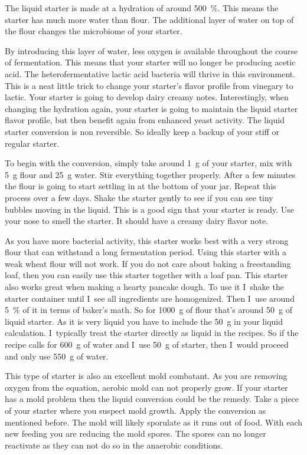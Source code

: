 The liquid starter is made at a hydration of around \qty{500}{\percent}. This means
the starter has much more water than flour. The additional layer of water on
top of the flour changes the microbiome of your starter.

By introducing this layer of water, less oxygen is available throughout the
course of fermentation. This means that your starter will no longer be
producing acetic acid. The heterofermentative lactic acid bacteria will thrive
in this environment. This is a neat little trick to change your starter's
flavor profile from vinegary to lactic. Your starter is going to develop
dairy creamy notes. Interestingly, when changing the hydration again, your starter
is going to maintain the liquid starter flavor profile, but then benefit again
from enhanced yeast activity. The liquid starter conversion is non reversible.
So ideally keep a backup of your stiff or regular starter.

To begin with the
conversion, simply take around \qty{1}{\gram} of your starter, mix with \qty{5}{\gram} flour and
\qty{25}{\gram} water. Stir everything together properly. After a few minutes the flour is
going to start settling in at the bottom of your jar. Repeat this process over
a few days. Shake the starter gently to see if you can see tiny  bubbles
moving in the liquid. This is a good sign that your starter is ready. Use your
nose to smell the starter. It should have a creamy dairy flavor note.

As you have more bacterial activity, this starter works best with a very strong
flour that can withstand a long fermentation period. Using this starter with a
weak wheat flour will not work. If you do not care about baking a freestanding loaf,
then you can easily use this starter together with a loaf pan.
This starter also works great when making a hearty pancake dough. To use it
I~shake the starter container until I~see all ingredients are homogenized.  Then
I~use around \qty{5}{\percent} of it in terms of baker's math. So for \qty{1000}{\gram} of flour
that's around \qty{50}{\gram} of liquid starter. As it is very liquid you have to
include the \qty{50}{\gram} in your liquid calculation. I~typically treat the starter
directly as liquid in the recipes. So if the recipe calls for \qty{600}{\gram} of water
and I~use \qty{50}{\gram} of starter, then I~would proceed and only use \qty{550}{\gram} of
water.

This type of starter is also an excellent mold combatant. As you are removing
oxygen from the equation, aerobic mold can not properly grow. If your starter
has a mold problem then the liquid conversion could be the remedy. Take a
piece of your starter where you suspect mold growth. Apply the conversion
as mentioned before. The mold will likely sporulate as it runs out of food.
With each new feeding you are reducing the mold spores. The spores can no
longer reactivate as they can not do so in the anaerobic conditions.


